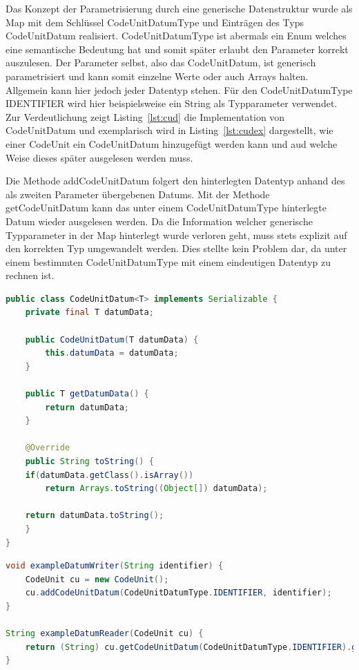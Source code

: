 \documentclass[12pt,oneside,a4paper,parskip]{scrbook}
\begin{document}
Das Konzept der Parametrisierung durch eine generische Datenstruktur wurde als Map mit dem Schlüssel CodeUnitDatumType und Einträgen des Typs CodeUnitDatum realisiert. CodeUnitDatumType ist abermals ein Enum welches eine semantische Bedeutung hat und somit später erlaubt den Parameter korrekt auszulesen. Der Parameter selbst, also das CodeUnitDatum, ist generisch parametrisiert und kann somit einzelne Werte oder auch Arrays halten. Allgemein kann hier jedoch jeder Datentyp stehen. Für den CodeUnitDatumType IDENTIFIER wird hier beispielsweise ein String als Typparameter verwendet. Zur Verdeutlichung zeigt Listing~\ref{lst:cud} die Implementation von CodeUnitDatum und exemplarisch wird in Listing~\ref{lst:cudex} dargestellt, wie einer CodeUnit ein CodeUnitDatum hinzugefügt werden kann und aud welche Weise dieses später ausgelesen werden muss. 

Die Methode addCodeUnitDatum folgert den hinterlegten Datentyp anhand des als zweiten Parameter übergebenen Datums. Mit der Methode getCodeUnitDatum kann das unter einem CodeUnitDatumType hinterlegte Datum wieder ausgelesen werden. Da die Information welcher generische Typparameter in der Map hinterlegt wurde verloren geht, muss stets explizit auf den korrekten Typ umgewandelt werden. Dies stellte kein Problem dar, da unter einem bestimmten CodeUnitDatumType mit einem eindeutigen Datentyp zu rechnen ist.

\begin{lstlisting}[label=lst:cud,
language=java,
firstnumber=1,
caption=Implementation der Klasse CodeUnitDatum.]
public class CodeUnitDatum<T> implements Serializable {
	private final T datumData;

	public CodeUnitDatum(T datumData) {
		this.datumData = datumData;
	}

	public T getDatumData() {
		return datumData;
	}

	@Override
	public String toString() {
	if(datumData.getClass().isArray())
		return Arrays.toString((Object[]) datumData);

	return datumData.toString();
	}
}
\end{lstlisting}

\begin{lstlisting}[label=lst:cudex,
language=java,
firstnumber=1,
caption=Beispiel zum konkreten hinterlegen und auslesen eines CodeUnitDatums.]
void exampleDatumWriter(String identifier) {
	CodeUnit cu = new CodeUnit();
	cu.addCodeUnitDatum(CodeUnitDatumType.IDENTIFIER, identifier);
}

String exampleDatumReader(CodeUnit cu) {
	return (String) cu.getCodeUnitDatum(CodeUnitDatumType.IDENTIFIER).getDatumData(); 
}
\end{lstlisting}
\end{document}
